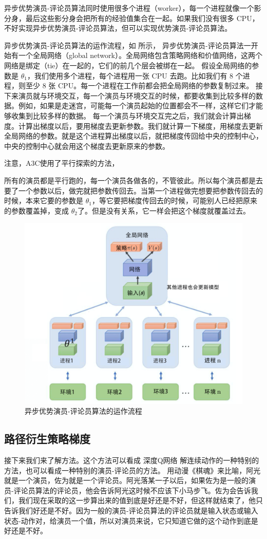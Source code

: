 异步优势演员-评论员算法同时使用很多个进程（worker），每一个进程就像一个影分身，最后这些影分身会把所有的经验值集合在一起。如果我们没有很多 CPU，不好实现异步优势演员-评论员算法，但可以实现优势演员-评论员算法。

异步优势演员-评论员算法的运作流程，如 所示，
  异步优势演员-评论员算法一开始有一个全局网络（global network）。全局网络包含策略网络和价值网络，这两个网络是绑定（tie）在一起的，它们的前几个层会被绑在一起。
  假设全局网络的参数是 $\theta_1$，我们使用多个进程，每个进程用一张 CPU 去跑。比如我们有 8 个进程，则至少 8 张 CPU。每一个进程在工作前都会把全局网络的参数复制过来。
  接下来演员就与环境交互，每一个演员与环境交互的时候，都要收集到比较多样的数据。例如，如果是走迷宫，可能每一个演员起始的位置都会不一样，这样它们才能够收集到比较多样的数据。
  每一个演员与环境交互完之后，我们就会计算出梯度。计算出梯度以后，要用梯度去更新参数。我们就计算一下梯度，用梯度去更新全局网络的参数。就是这个进程算出梯度以后，就把梯度传回给中央的控制中心，中央的控制中心就会用这个梯度去更新原来的参数。
  
  注意，A3C使用了平行探索的方法，

  所有的演员都是平行跑的，每一个演员各做各的，不管彼此。所以每个演员都是去要了一个参数以后，做完就把参数传回去。当第一个进程做完想要把参数传回去的时候，本来它要的参数是 $\theta_1$，等它要把梯度传回去的时候，可能别人已经把原来的参数覆盖掉，变成 $\theta_2$了。但是没有关系，它一样会把这个梯度就覆盖过去。


\begin{figure}[hbt]
  \centering
  \includegraphics[width=0.4\linewidth]{res/ch9/9.8}
  \caption{异步优势演员-评论员算法的运作流程}
  \label{fig:fig9.8}
\end{figure}

\subsection{路径衍生策略梯度} 

接下来我们来了解方法。这个方法可以看成 深度Q网络 解连续动作的一种特别的方法，也可以看成一种特别的演员-评论员的方法。
用动漫《棋魂》来比喻，阿光就是一个演员，佐为就是一个评论员。阿光落某一子以后，如果佐为是一般的演员-评论员算法的评论员，他会告诉阿光这时候不应该下小马步飞。佐为会告诉我们，我们现在采取的这一步算出来的值到底是好还是不好，但这样就结束了，他只告诉我们好还是不好。因为一般的演员-评论员算法的评论员就是输入状态或输入状态-动作对，给演员一个值，所以对演员来说，它只知道它做的这个动作到底是好还是不好。

